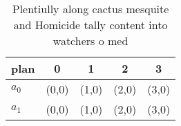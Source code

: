 \documentclass[a4paper]{article}
\begin{document}
\begin{table}
\begin{adjustbox}{width=0.5\columnwidth}
\begin{tabular}{|l|l|l|l|l|}
\hline
\textbf{plan} & \multicolumn{1}{c|}{\textbf{0}} & \multicolumn{1}{c|}{\textbf{1}} & \multicolumn{1}{c|}{\textbf{2}} & \multicolumn{1}{c|}{\textbf{3}} \\ \hline
\textbf{$a_0$}  & (0,0) & (1,0) & (2,0) & (3,0) \\ \hline
\textbf{$a_1$}  & (0,0) & (1,0) & (2,0) & (3,0) \\ \hline
\end{tabular}
\end{adjustbox}
\caption{Plentiully along cactus mesquite and Homicide tally content into watchers o med
}
\end{table}
\end{document}
